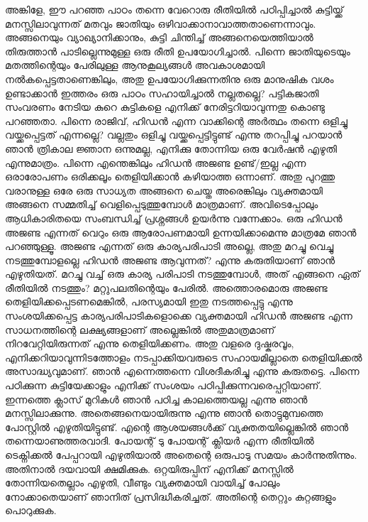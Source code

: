 \begin{enumerate}
അങ്കിളേ, ഈ പറഞ്ഞ പാഠം തന്നെ വേറൊരു രീതിയില്‍ പഠിപ്പിച്ചാല്‍ കുട്ടിയ്ക്ക് മനസ്സിലാവുന്നത് മതവും ജാതിയും 
ഒഴിവാക്കാനാവാത്തതാണെന്നാവും. അങ്ങനെയും വ്യാഖ്യാനിക്കാനും, കുട്ടി ചിന്തിച്ച് അങ്ങനെയെത്തിയാല്‍ തിരുത്താന്‍ 
പാടില്ലെന്നുമുള്ള ഒരു രീതി ഉപയോഗിച്ചാല്‍. പിന്നെ ജാതിയുടെയും മതത്തിന്റെയും പേരിലുള്ള ആനുകൂല്യങ്ങള്‍ 
അവകാശമായി നല്‍കപ്പെട്ടതാണെങ്കിലും, അതു ഉപയോഗിക്കുന്നതിനു ഒരു മാനുഷിക വശം ഉണ്ടാക്കാന്‍ ഇത്തരം 
ഒരു പാഠം സഹായിച്ചാല്‍ നല്ലതല്ലെ? പട്ടികജാതി സംവരണം നേടിയ കുറെ കുട്ടികളെ എനിക്ക് നേരിട്ടറിയാവുന്നതു 
കൊണ്ടു പറഞ്ഞതാ. പിന്നെ രാജിവ്, ഹിഡന്‍ എന്ന വാക്കിന്റെ അര്‍ത്ഥം തന്നെ ഒളിച്ചു വയ്ക്കപ്പെട്ടത് എന്നല്ലെ? 
വല്ലതും ഒളിച്ചു വയ്ക്കപ്പെട്ടിട്ടുണ്ട് എന്നു തറപ്പിച്ചു പറയാന്‍ ഞാന്‍ ത്രികാല ജ്ഞാന ഒന്നുമല്ല, എനിക്കു തോന്നിയ ഒരു വേര്‍ഷന്‍ 
എഴുതി എന്നുമാത്രം. പിന്നെ എന്തെങ്കിലും ഹിഡന്‍ അജണ്ട ഉണ്ട്/ഇല്ല എന്ന ഒരാരോപണം ഒരിക്കലൂം തെളിയിക്കാന്‍ 
കഴിയാത്ത ഒന്നാണ്. അതു പുറത്തു വരാനുള്ള ഒരേ ഒരു സാധ്യത അങ്ങനെ ചെയ്ത അരെങ്കിലും വ്യക്തമായി അങ്ങനെ 
സമ്മതിച്ച് വെളിപ്പെടുത്തുമ്പോള്‍ മാത്രമാണ്. അവിടെപ്പോലും ആധികാരിതയെ സംബന്ധിച്ച് പ്രശ്നങ്ങള്‍ ഉയര്‍ന്നു വന്നേക്കാം. 
ഒരു ഹിഡന്‍ അജണ്ട എന്നത് വെറും ഒരു ആരോപണമായി ഉന്നയിക്കാമെന്നു മാത്രമേ ഞാന്‍ പറഞ്ഞുള്ളൂ. അജണ്ട 
എന്നത് ഒരു കാര്യപരിപാടി അല്ലെ, അതു മറച്ചു വെച്ചു നടത്തുമ്പോളല്ലെ ഹിഡന്‍ അജണ്ട ആവുന്നത്? എന്നു കരുതിയാണ് 
ഞാന്‍ എഴുതിയത്. മറച്ചു വച്ച് ഒരു കാര്യ പരിപാടി നടത്തുമ്പോള്‍, അത് എങ്ങനെ ഏത് രീതിയില്‍ നടത്തും? 
മറ്റുപലതിന്റെയും പേരില്‍. അത്തൊരമൊരു അജണ്ട തെളിയിക്കപ്പെടണമെങ്കില്‍, പരസ്യമായി ഇതു നടത്തപ്പെട്ടു 
എന്നു സംശയിക്കപ്പെട്ട കാര്യപരിപാടികളൊക്കെ വ്യക്തമായി ഹിഡന്‍ അജണ്ട എന്ന സാധനത്തിന്റെ ലക്ഷ്യങ്ങളാണ് 
അല്ലെങ്കില്‍ അതുമാത്രമാണ് നിറവേറ്റിയിരുന്നത് എന്നു തെളിയിക്കണം. അതു വളരെ ദുഷ്കരവൂം, എനിക്കറിയാവുന്നിടത്തോളം 
നടപ്പാക്കിയവരുടെ സഹായമില്ലാതെ തെളിയിക്കല്‍ അസാദ്ധ്യവുമാണ്. ഞാന്‍ എന്നെത്തന്നെ വിശദീകരിച്ചു എന്നു 
കരുതട്ടെ. പിന്നെ പഠിക്കുന്ന കുട്ടിയേക്കാളും എനിക്ക് സംശയം പഠിപ്പിക്കുന്നവരെപ്പറ്റിയാണ്. ഇന്നത്തെ ക്ലാസ് മുറികള്‍ 
ഞാന്‍ പഠിച്ച കാലത്തെയല്ല എന്നു ഞാന്‍ മനസ്സിലാക്കുന്നു. അതെങ്ങനെയായിരുന്നു എന്നു ഞാന്‍ തൊട്ടുമുമ്പത്തെ 
പോസ്റ്റില്‍ എഴുതിയിട്ടുണ്ട്. എന്റെ ആശയങ്ങള്‍ക്ക് വ്യക്തതയില്ലെങ്കില്‍ ഞാന്‍ തന്നെയാണുത്തരവാദി. 
പോയന്റ് ടു പോയന്റ് ക്ലിയര്‍ എന്ന രീതിയില്‍ ടെക്നിക്കല്‍ പേപ്പറായി എഴുതിയാല്‍ അതെന്റെ ഒരുപാടു സമയം 
കാര്‍ന്നുതിന്നും. അതിനാല്‍ ദയവായി ക്ഷമിക്കുക. ഒറ്റയിരുപ്പിന് എനിക്ക് മനസ്സില്‍ തോന്നിയതെല്ലാം എഴുതി, വീണ്ടും 
വ്യക്തമായി വായിച്ച് പോലും നോക്കാതെയാണ് ഞാനിത് പ്രസിദ്ധീകരിച്ചത്. അതിന്റെ തെറ്റും കുറ്റങ്ങളും പൊറുക്കുക.

\end{enumerate}

\newpage

